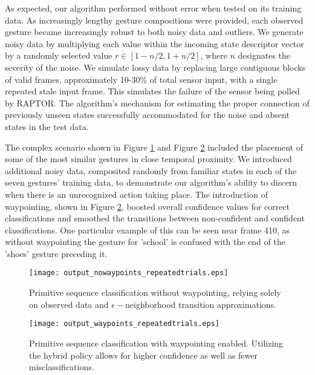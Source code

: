 \documentclass[letterpaper]{article}
\begin{document}
As expected, our algorithm performed without error when tested on its training data. As increasingly lengthy gesture compositions were provided, each observed gesture became increasingly robust to both noisy data and outliers. We generate noisy data by multiplying each value within the incoming state descriptor vector by a randomly selected value $r \in [1 - n/2, 1 + n/2]$, where $n$ designates the severity of the noise. We simulate lossy data by replacing large contiguous blocks of valid frames, approximately 10-30\% of total sensor input, with a single repeated stale input frame. This simulates the failure of the sensor being polled by RAPTOR. The algorithm's mechanism for estimating the proper connection of previously unseen states successfully accommodated for the noise and absent states in the test data. 

The complex scenario shown in Figure \ref{fig:output_nowaypoints_repeatedtrials} and Figure \ref{fig:output_waypoints_repeatedtrials} included the placement of some of the most similar gestures in close temporal proximity. We introduced additional noisy data, composited randomly from familiar states in each of the seven gestures' training data, to demonstrate our algorithm's ability to discern when there is an unrecognized action taking place. The introduction of waypointing, shown in Figure \ref{fig:output_waypoints_repeatedtrials}, boosted overall confidence values for correct classifications and smoothed the transitions between non-confident and confident classifications. One particular example of this can be seen near frame 410, as without waypointing the gesture for 'school' is confused with the end of the 'shoes' gesture preceding it. 

\begin{figure}[t]
\begin{center}
\texttt{[image: output\_nowaypoints\_repeatedtrials.eps]}
\caption{Primitive sequence classification without waypointing, relying solely on observed data and $\epsilon-$neighborhood transition approximations.}
\label{fig:output_nowaypoints_repeatedtrials}
\end{center}
\end{figure}

\begin{figure}[t]
\begin{center}
\texttt{[image: output\_waypoints\_repeatedtrials.eps]}
\caption{Primitive sequence classification with waypointing enabled. Utilizing the hybrid policy allows for higher confidence as well as fewer misclassifications.}
\label{fig:output_waypoints_repeatedtrials}
\end{center}
\end{figure}
\end{document}
